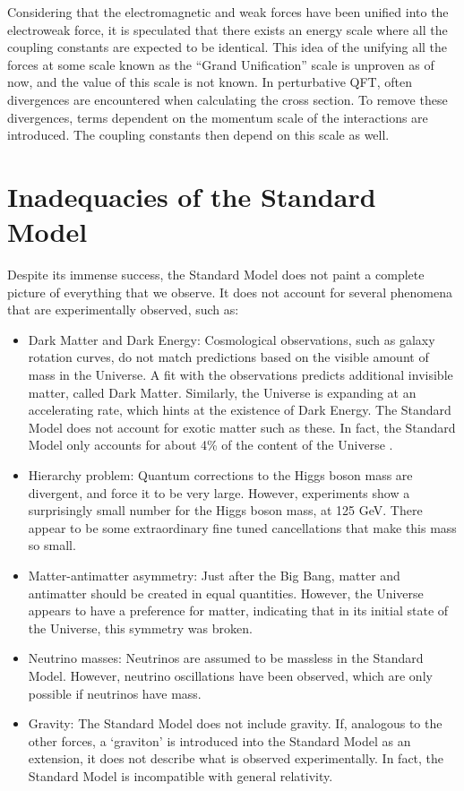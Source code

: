 \documentclass[12pt,a4paper,openright,twoside]{report}
\begin{document}
Considering that the electromagnetic and weak forces have been unified into the electroweak force, it is speculated that there exists an energy scale where all the coupling constants are expected to be identical. This idea of the unifying all the forces at some scale known as the ``Grand Unification'' scale is unproven as of now, and the value of this scale is not known. In perturbative QFT, often divergences are encountered when calculating the cross section. To remove these divergences, terms dependent on the momentum scale of the interactions are introduced. The coupling constants then depend on this scale as well.

\section{Inadequacies of the Standard Model}
Despite its immense success, the Standard Model does not paint a complete picture of everything that we observe. It does not account for several phenomena that are experimentally observed, such as:
\begin{itemize}
\item Dark Matter and Dark Energy: Cosmological observations, such as galaxy rotation curves, do not match predictions based on the visible amount of mass in the Universe. A fit with the observations predicts additional invisible matter, called Dark Matter\cite{DM_inc}. Similarly, the Universe is expanding at an accelerating rate, which hints at the existence of Dark Energy\cite{DE}. The Standard Model does not account for exotic matter such as these. In fact, the Standard Model only accounts for about 4\% of the content of the Universe \cite{Planck,DM_comp}.

\item Hierarchy problem\cite{hierarchy1,hierarchy2,hierarchy3,hierarchy4}: Quantum corrections to the Higgs boson mass are divergent, and force it to be very large. However, experiments show a surprisingly small number for the Higgs boson mass, at 125 GeV. There appear to be some extraordinary fine tuned cancellations that make this mass so small.

\item Matter-antimatter asymmetry: Just after the Big Bang, matter and antimatter should be created in equal quantities. However, the Universe appears to have a preference for matter, indicating that in its initial state of the Universe, this symmetry was broken\cite{Baryon_Asymmetry}.

\item Neutrino masses: Neutrinos are assumed to be massless in the Standard Model. However, neutrino oscillations have been observed\cite{neutrino2}, which are only possible if neutrinos have mass\cite{neutrino_mass}.

\item Gravity: The Standard Model does not include gravity. If, analogous to the other forces, a `graviton' is introduced into the Standard Model as an extension, it does not describe what is observed experimentally. In fact, the Standard Model is incompatible with general relativity\cite{grav_inc}.

\end{itemize}
\end{document}
